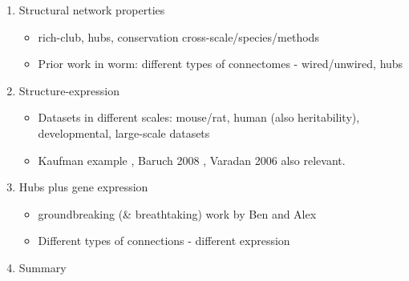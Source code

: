 \documentclass[10pt,letterpaper]{article}
\begin{document}
\begin{enumerate}
    \item{Structural network properties}
    \begin{itemize}
    \item{rich-club, hubs, conservation cross-scale/species/methods}
    \item{Prior work in worm: different types of connectomes - wired/unwired, hubs}
    \end{itemize}

    \item{Structure-expression}
    \begin{itemize}
    \item{Datasets in different scales: mouse/rat, human (also heritability), developmental, large-scale datasets}
    \item{Kaufman example \cite{Kaufman2006}, Baruch 2008 \cite{Baruch2008b}, Varadan 2006 \cite{Varadan2006} also relevant.}
    \end{itemize}

    \item{Hubs plus gene expression}
    \begin{itemize}
    \item{groundbreaking (\& breathtaking) work by Ben and Alex \cite{Fulcher2016}}
    \item{Different types of connections - different expression}
    \end{itemize}
    \item{Summary}

 \end{enumerate}
\end{document}
